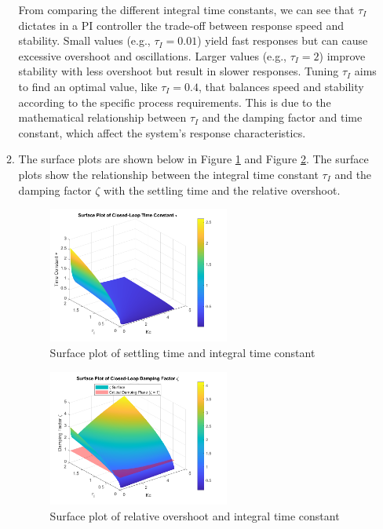\documentclass[12pt]{article}
\begin{document}
\begin{enumerate}
\begin{enumerate}
    From comparing the different integral time constants, we can see that \(\tau_I\) dictates in a PI controller the trade-off between response speed and stability. Small values (e.g., \(\tau_I = 0.01\)) yield fast responses but can cause excessive overshoot and oscillations. Larger values (e.g., \(\tau_I = 2\)) improve stability with less overshoot but result in slower responses. Tuning \(\tau_I\) aims to find an optimal value, like \(\tau_I = 0.4\), that balances speed and stability according to the specific process requirements. This is due to the mathematical relationship between \(\tau_I\) and the damping factor and time constant, which affect the system's response characteristics.

    \pagebreak

    \item
    The surface plots are shown below in Figure \ref{fig:figure1_9} and Figure \ref{fig:figure1_10}. The surface plots show the relationship between the integral time constant \( \tau_I \) and the damping factor \( \zeta \) with the settling time and the relative overshoot.

    \begin{figure}[H]
      \centering
      \includegraphics[width=0.6\textwidth]{Figures/figure1_10a.png}
      \caption{Surface plot of settling time and integral time constant}
      \label{fig:figure1_9}
    \end{figure}

    \begin{figure}[H]
      \centering
      \includegraphics[width=0.6\textwidth]{Figures/figure1_10b.png}
      \caption{Surface plot of relative overshoot and integral time constant}
      \label{fig:figure1_10}
    \end{figure}


\end{enumerate}
\end{enumerate}
\end{document}
